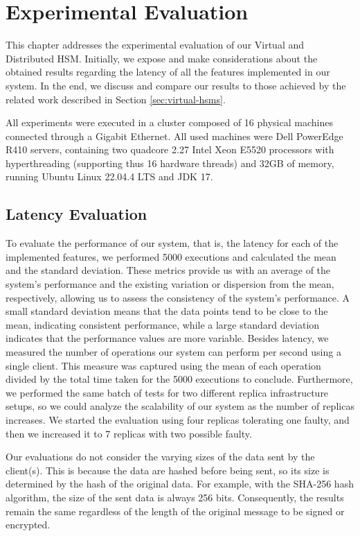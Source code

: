 \chapter{Experimental Evaluation} \label{chap:evaluation}
This chapter addresses the experimental evaluation of our Virtual and Distributed HSM. Initially, we expose and make considerations about the obtained results regarding the latency of all the features implemented in our system. In the end, we discuss and compare our results to those achieved by the related work described in Section \ref{sec:virtual-hsms}.   

All experiments were executed in a cluster composed of 16 physical machines connected through a Gigabit Ethernet. All used machines were Dell PowerEdge R410 servers, containing two quadcore 2.27 Intel Xeon E5520 processors with hyperthreading (supporting thus 16 hardware threads) and 32GB of memory, running Ubuntu Linux 22.04.4 LTS and JDK 17.


\section{Latency Evaluation} \label{sec:latency-throughput-eval}

To evaluate the performance of our system, that is, the latency for each of the implemented features, we performed 5000 executions and calculated the mean and the standard deviation. These metrics provide us with an average of the system's performance and the existing variation or dispersion from the mean, respectively, allowing us to assess the consistency of the system's performance. A small standard deviation means that the data points tend to be close to the mean, indicating consistent performance, while a large standard deviation indicates that the performance values are more variable. Besides latency, we measured the number of operations our system can perform per second using a single client. This measure was captured using the mean of each operation divided by the total time taken for the 5000 executions to conclude. Furthermore, we performed the same batch of tests for two different replica infrastructure setups, so we could analyze the scalability of our system as the number of replicas increases. We started the evaluation using four replicas tolerating one faulty, and then we increased it to 7 replicas with two possible faulty.

Our evaluations do not consider the varying sizes of the data sent by the client(s). This is because the data are hashed before being sent, so its size is determined by the hash of the original data. For example, with the SHA-256 hash algorithm, the size of the sent data is always 256 bits. Consequently, the results remain the same regardless of the length of the original message to be signed or encrypted.

